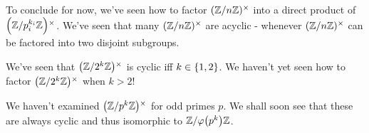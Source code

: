 \begin{remark}
  To conclude for now, we've seen how to factor $\Zmodnx$ into a direct
  product of $\Zmodx{p_i^{k_i}}$. We've seen that many $\Zmodnx$ are
  acyclic - whenever $\Zmodnx$ can be factored into two disjoint
  subgroups.

  We've seen that $\Zmodx{2^k}$ is cyclic iff $k \in \setof{1, 2}$. We
  haven't yet seen how to factor $\Zmodx{2^k}$ when $k > 2$!

  We haven't examined $\Zmodx{p^k}$ for odd primes $p$. We shall soon
  see that these are always cyclic and thus isomorphic to
  $\Zmod{\vphif{p^k}}$.
\end{remark}


